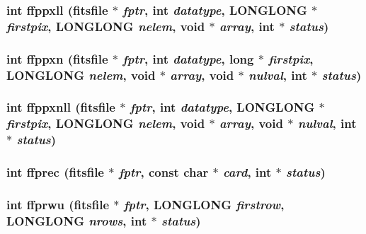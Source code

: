 \subsubsection{\setlength{\rightskip}{0pt plus 5cm}int ffppxll (\bf{fitsfile} $\ast$ {\em fptr}, int {\em datatype}, \bf{LONGLONG} $\ast$ {\em firstpix}, \bf{LONGLONG} {\em nelem}, void $\ast$ {\em array}, int $\ast$ {\em status})}\label{fitsio__64_8h_a5a52d455af81ac3c3ea32e15ce790fe}


\subsubsection{\setlength{\rightskip}{0pt plus 5cm}int ffppxn (\bf{fitsfile} $\ast$ {\em fptr}, int {\em datatype}, long $\ast$ {\em firstpix}, \bf{LONGLONG} {\em nelem}, void $\ast$ {\em array}, void $\ast$ {\em nulval}, int $\ast$ {\em status})}\label{fitsio__64_8h_2ff55dfbe37f1ecf48227480629dc956}


\subsubsection{\setlength{\rightskip}{0pt plus 5cm}int ffppxnll (\bf{fitsfile} $\ast$ {\em fptr}, int {\em datatype}, \bf{LONGLONG} $\ast$ {\em firstpix}, \bf{LONGLONG} {\em nelem}, void $\ast$ {\em array}, void $\ast$ {\em nulval}, int $\ast$ {\em status})}\label{fitsio__64_8h_a46e0229ce53eaeb3e024daff7cda152}


\subsubsection{\setlength{\rightskip}{0pt plus 5cm}int ffprec (\bf{fitsfile} $\ast$ {\em fptr}, const char $\ast$ {\em card}, int $\ast$ {\em status})}\label{fitsio__64_8h_b8a4ffee9072c15ac03cdb0c28a50730}


\subsubsection{\setlength{\rightskip}{0pt plus 5cm}int ffprwu (\bf{fitsfile} $\ast$ {\em fptr}, \bf{LONGLONG} {\em firstrow}, \bf{LONGLONG} {\em nrows}, int $\ast$ {\em status})}\label{fitsio__64_8h_a9ad4a1b317ff4337067d66288c9a245}


